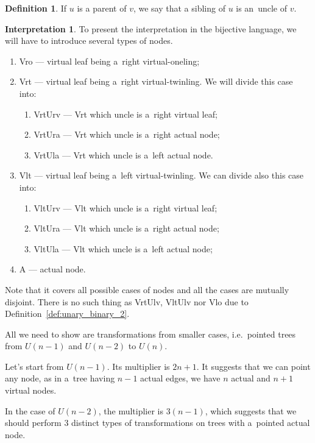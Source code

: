 \documentclass[final]{article}
\theoremstyle{definition}
\newtheorem{definition}{Definition}[subsection]
\theoremstyle{definition}
\newtheorem{interpretation}{Interpretation}[subsection]
\theoremstyle{remark}
\begin{document}
\begin{definition}
    If \(u\) is a parent of \(v\), we say that a sibling of \(u\) is an~uncle of \(v\).
\end{definition}

\begin{interpretation}
To present the interpretation in the bijective language, we will have to introduce several types of nodes.

\begin{enumerate}
    \item Vro --- virtual leaf being a~right virtual-oneling;
    \item Vrt --- virtual leaf being a~right virtual-twinling. We will divide this case into:
        \begin{enumerate}
            \item VrtUrv --- Vrt which uncle is a~right virtual leaf;
            \item VrtUra --- Vrt which uncle is a~right actual node;
            \item VrtUla --- Vrt which uncle is a~left actual node.
        \end{enumerate}
    \item Vlt --- virtual leaf being a~left virtual-twinling. We can divide also this case into:
        \begin{enumerate}
            \item VltUrv --- Vlt which uncle is a~right virtual leaf;
            \item VltUra --- Vlt which uncle is a~right actual node;
            \item VltUla --- Vlt which uncle is a~left actual node;
        \end{enumerate}
    \item A --- actual node.
\end{enumerate}

Note that it covers all possible cases of nodes and all the cases are mutually disjoint. There is no such thing as VrtUlv, VltUlv nor Vlo due to Definition~\ref{def:unary_binary_2}.

All we need to show are transformations from smaller cases, i.e.~pointed trees from \(U(n-1)\) and \(U(n-2)\) to \(U(n)\).

Let's start from \(U(n-1)\). Its multiplier is \(2n + 1\). It suggests that we can point any node, as in a~tree having \(n - 1\) actual edges, we have \(n\) actual and \(n + 1\) virtual nodes.

In the case of \(U(n-2)\), the multiplier is \(3(n-1)\), which suggests that we should perform \(3\) distinct types of transformations on trees with a~pointed actual node.


\end{interpretation}
\end{document}

